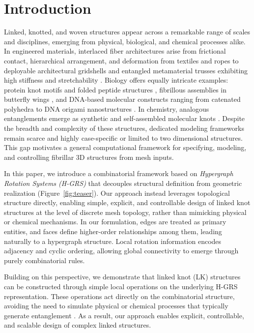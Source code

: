 \documentclass[acmtog]{acmart}
\begin{document}
\section{Introduction}
\label{sec:intro}

Linked, knotted, and woven structures appear across a remarkable range of scales and disciplines, emerging from physical, biological, and chemical processes alike. In engineered materials, interlaced fiber architectures arise from frictional contact, hierarchical arrangement, and deformation from textiles and ropes \citep{knittel2020modelling,niu2025geometric,singal2024programming} to deployable architectural gridshells \citep{yang2025topologicalwovennodes,liu2025doublelayeredegridshells} and entangled metamaterial trusses exhibiting high stiffness and stretchability \citep{surjadi2025doublenetwork,moestopo2023knots}. Biology offers equally intricate examples: protein knot motifs and folded peptide structures \citep{craik2001cystine}, fibrillous assemblies in butterfly wings \citep{jessop2025butterfly}, and DNA-based molecular constructs ranging from catenated polyhedra \citep{zhang1994dnatroctahedron} to DNA origami nanostructures \citep{glaser2021dnananostructures}. In chemistry, analogous entanglements emerge as synthetic and self-assembled molecular knots \citep{horner2016knot,fielden2017molecular,forgan2011chemical}. Despite the breadth and complexity of these structures, dedicated modeling frameworks remain scarce and highly case-specific\citep{carton2026threedwovendesign} or limited to two dimensional structures\citep{sonia2026constructionperiodic}. This gap motivates a general computational framework for specifying, modeling, and controlling fibrillar 3D structures from mesh inputs.

In this paper, we introduce a combinatorial framework based on \emph{Hypergraph Rotation Systems (H-GRS)} that decouples structural definition from geometric realization (Figure~\ref{fig:teaser}). Our approach instead leverages topological structure directly, enabling simple, explicit, and controllable design of linked knot structures at the level of discrete mesh topology, rather than mimicking physical or chemical mechanisms. In our formulation, edges are treated as primary entities, and faces define higher-order relationships among them, leading naturally to a hypergraph structure. Local rotation information encodes adjacency and cyclic ordering, allowing global connectivity to emerge through purely combinatorial rules.

Building on this perspective, we demonstrate that linked knot (LK) structures can be constructed through simple local operations on the underlying H-GRS representation. These operations act directly on the combinatorial structure, avoiding the need to simulate physical or chemical processes that typically generate entanglement \citep{moestopo2023knots}. As a result, our approach enables explicit, controllable, and scalable design of complex linked structures.
\end{document}
